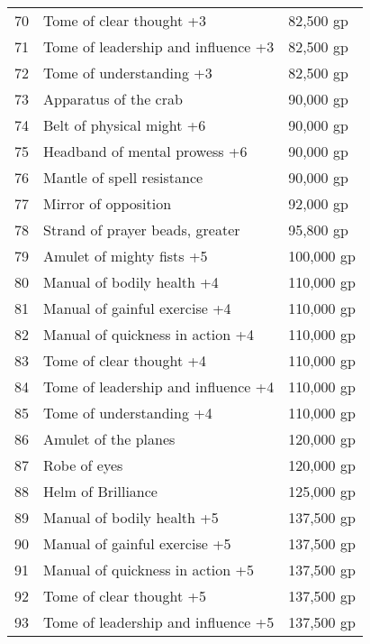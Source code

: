 \begin{table}[]
\begin{tabular}{lll}
70  & Tome of clear thought +3                       & 82,500 gp    \\
71  & Tome of leadership and influence +3            & 82,500 gp    \\
72  & Tome of understanding +3                       & 82,500 gp    \\
73  & Apparatus of the crab                          & 90,000 gp    \\
74  & Belt of physical might +6                      & 90,000 gp    \\
75  & Headband of mental prowess +6                  & 90,000 gp    \\
76  & Mantle of spell resistance                     & 90,000 gp    \\
77  & Mirror of opposition                           & 92,000 gp    \\
78  & Strand of prayer beads, greater                & 95,800 gp    \\
79  & Amulet of mighty fists +5                      & 100,000 gp   \\
80  & Manual of bodily health +4                     & 110,000 gp   \\
81  & Manual of gainful exercise +4                  & 110,000 gp   \\
82  & Manual of quickness in action +4               & 110,000 gp   \\
83  & Tome of clear thought +4                       & 110,000 gp   \\
84  & Tome of leadership and influence +4            & 110,000 gp   \\
85  & Tome of understanding +4                       & 110,000 gp   \\
86  & Amulet of the planes                           & 120,000 gp   \\
87  & Robe of eyes                                   & 120,000 gp   \\
88  & Helm of Brilliance                             & 125,000 gp   \\
89  & Manual of bodily health +5                     & 137,500 gp   \\
90  & Manual of gainful exercise +5                  & 137,500 gp   \\
91  & Manual of quickness in action +5               & 137,500 gp   \\
92  & Tome of clear thought +5                       & 137,500 gp   \\
93  & Tome of leadership and influence +5            & 137,500 gp   \\

\end{tabular}
\end{table}
